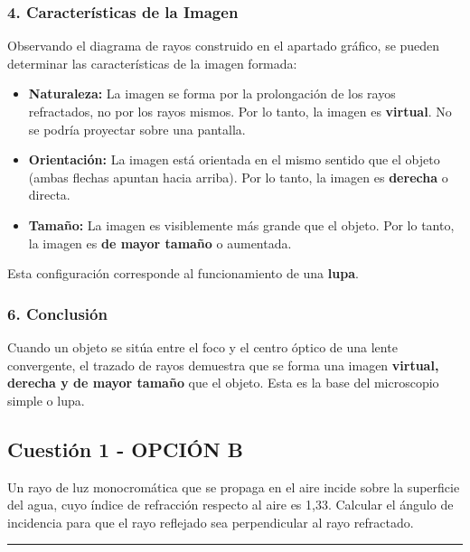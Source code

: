 \subsubsection*{4. Características de la Imagen}
Observando el diagrama de rayos construido en el apartado gráfico, se pueden determinar las características de la imagen formada:
\begin{itemize}
    \item \textbf{Naturaleza:} La imagen se forma por la prolongación de los rayos refractados, no por los rayos mismos. Por lo tanto, la imagen es \textbf{virtual}. No se podría proyectar sobre una pantalla.
    \item \textbf{Orientación:} La imagen está orientada en el mismo sentido que el objeto (ambas flechas apuntan hacia arriba). Por lo tanto, la imagen es \textbf{derecha} o directa.
    \item \textbf{Tamaño:} La imagen es visiblemente más grande que el objeto. Por lo tanto, la imagen es \textbf{de mayor tamaño} o aumentada.
\end{itemize}
Esta configuración corresponde al funcionamiento de una \textbf{lupa}.

\subsubsection*{6. Conclusión}
\begin{cajaconclusion}
Cuando un objeto se sitúa entre el foco y el centro óptico de una lente convergente, el trazado de rayos demuestra que se forma una imagen \textbf{virtual, derecha y de mayor tamaño} que el objeto. Esta es la base del microscopio simple o lupa.
\end{cajaconclusion}

\newpage

\subsection{Cuestión 1 - OPCIÓN B}
\label{subsec:3B_2000_jun_ord}

\begin{cajaenunciado}
Un rayo de luz monocromática que se propaga en el aire incide sobre la superficie del agua, cuyo índice de refracción respecto al aire es 1,33. Calcular el ángulo de incidencia para que el rayo reflejado sea perpendicular al rayo refractado.
\end{cajaenunciado}
\hrule

